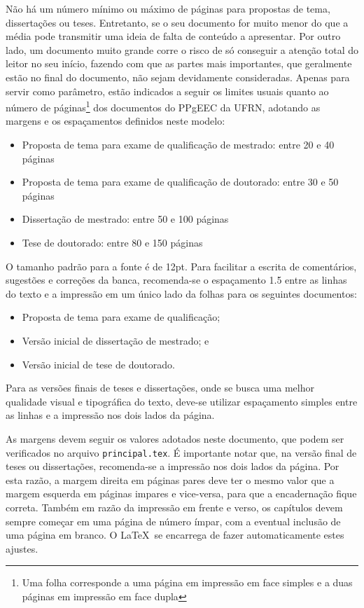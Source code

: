 Não há um número mínimo ou máximo de páginas para propostas de tema,
dissertações ou teses. Entretanto, se o seu documento for muito menor
do que a média pode transmitir uma ideia de falta de conteúdo a
apresentar. Por outro lado, um documento muito grande corre o risco de
só conseguir a atenção total do leitor no seu início, fazendo com que
as partes mais importantes, que geralmente estão no final do
documento, não sejam devidamente consideradas. Apenas para servir como
parâmetro, estão indicados a seguir os limites usuais quanto ao número
de páginas\footnote{Uma folha corresponde a uma página em impressão em
face simples e a duas páginas em impressão em face dupla} dos
documentos do PPgEEC da UFRN, adotando as margens e os espaçamentos
definidos neste modelo:
\begin{itemize}
\item Proposta de tema para exame de qualificação de mestrado:
entre 20 e 40 páginas
\item Proposta de tema para exame de qualificação de doutorado:
entre 30 e 50 páginas
\item Dissertação de mestrado:
entre 50 e 100 páginas
\item Tese de doutorado:
entre 80 e 150 páginas
\end{itemize}

O tamanho padrão para a fonte é de 12pt.  Para facilitar a escrita de
comentários, sugestões e correções da banca, recomenda-se o espaçamento
1.5 entre as linhas do texto e a impressão em um único lado da folhas
para os seguintes documentos:
\begin{itemize}
\item Proposta de tema para exame de qualificação;
\item Versão inicial de dissertação de mestrado; e
\item Versão inicial de tese de doutorado.
\end{itemize}
Para as versões finais de teses e dissertações, onde se busca uma
melhor qualidade visual e tipográfica do texto, deve-se utilizar
espaçamento simples entre as linhas e a impressão nos dois lados da
página.

As margens devem seguir os valores adotados neste documento, que podem
ser verificados no arquivo \texttt{principal.tex}. É importante notar
que, na versão final de teses ou dissertações, recomenda-se a
impressão nos dois lados da página. Por esta razão, a margem direita
em páginas pares deve ter o mesmo valor que a margem esquerda em
páginas impares e vice-versa, para que a encadernação fique
correta. Também em razão da impressão em frente e verso, os capítulos
devem sempre começar em uma página de número ímpar, com a eventual
inclusão de uma página em branco. O \LaTeX\ se encarrega de fazer
automaticamente estes ajustes.

